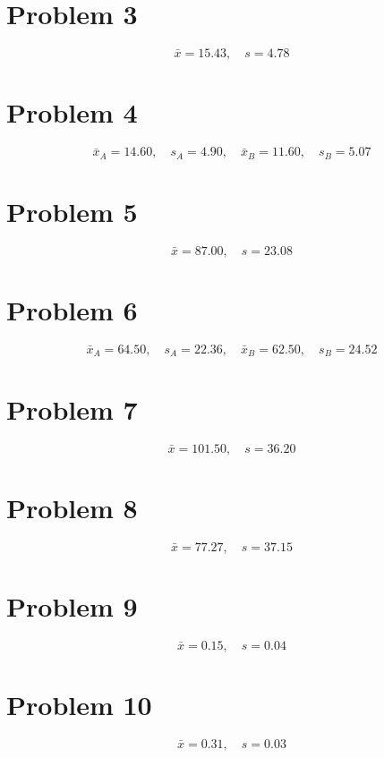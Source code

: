 \section*{Problem 3}
\[
\bar{x}=15.43,\quad s=4.78
\]

\section*{Problem 4}
\[
\bar{x}_A=14.60,\quad s_A=4.90,\quad \bar{x}_B=11.60,\quad s_B=5.07
\]

\section*{Problem 5}
\[
\bar{x}=87.00,\quad s=23.08
\]

\section*{Problem 6}
\[
\bar{x}_A=64.50,\quad s_A=22.36,\quad \bar{x}_B=62.50,\quad s_B=24.52
\]

\section*{Problem 7}
\[
\bar{x}=101.50,\quad s=36.20
\]

\section*{Problem 8}
\[
\bar{x}=77.27,\quad s=37.15
\]

\section*{Problem 9}
\[
\bar{x}=0.15,\quad s=0.04
\]

\section*{Problem 10}
\[
\bar{x}=0.31,\quad s=0.03
\]



